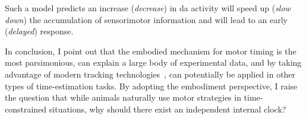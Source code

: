 Such a model predicts an increase (\textit{decrease}) in \gls{da} activity will speed up (\textit{slow down}) the accumulation of sensorimotor information and will lead to an early (\textit{delayed}) response.
\par
In conclusion, I point out that the embodied mechanism for motor timing is the most parsimonious, can explain a large body of experimental data, and by taking advantage of modern tracking technologies~\cite{DeepLabCut2018NN}, can potentially be applied in other types of time-estimation tasks.
By adopting the embodiment perspective, I raise the question that while animals naturally use motor strategies in time-constrained situations, why should there exist an independent internal clock?